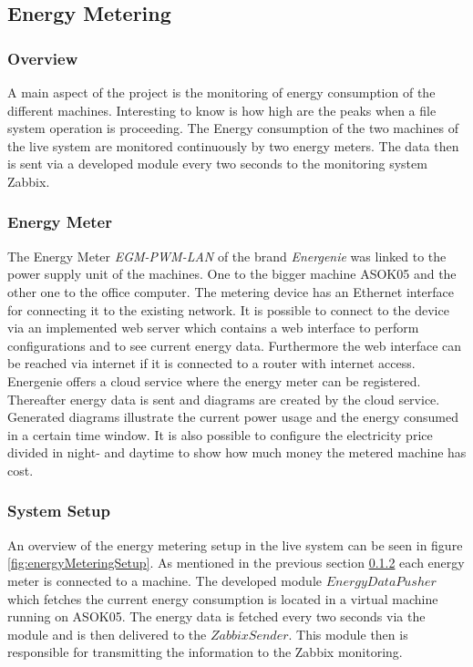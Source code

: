 \subsection{Energy Metering}

\subsubsection{Overview}
A main aspect of the project is the monitoring of energy consumption of the different machines. Interesting to know is how high are the peaks when a file system operation is proceeding. The Energy consumption of the two machines of the live system are monitored continuously by two energy meters. The data then is sent via a developed module every two seconds to the monitoring system Zabbix.

\subsubsection{Energy Meter}
\label{sec:EnergyMeter}
The Energy Meter \textit{EGM-PWM-LAN} of the brand \textit{Energenie} was linked to the power supply unit of the machines. One to the bigger machine ASOK05 and the other one to the office computer. The metering device has an Ethernet interface for connecting it to the existing network. It is possible to connect to the device via an implemented web server which contains a web interface to perform configurations and to see current energy data. Furthermore the web interface can be reached via internet if it is connected to a router with internet access. Energenie offers a cloud service \cite{Energenie.2014} where the energy meter can be registered. Thereafter energy data is sent and diagrams are created by the cloud service. Generated diagrams illustrate the current power usage and the energy consumed in a certain time window. It is also possible to configure the electricity price divided in night- and daytime to show how much money the metered machine has cost.

\subsubsection{System Setup}
An overview of the energy metering setup in the live system can be seen in figure \ref{fig:energyMeteringSetup}. As mentioned in the previous section \ref{sec:EnergyMeter} each energy meter is connected to a machine. The developed module $ EnergyDataPusher $ which fetches the current energy consumption is located in a virtual machine running on ASOK05. The energy data is fetched every two seconds via the module and is then delivered to the $ ZabbixSender $. This module then is responsible for transmitting the information to the Zabbix monitoring.

